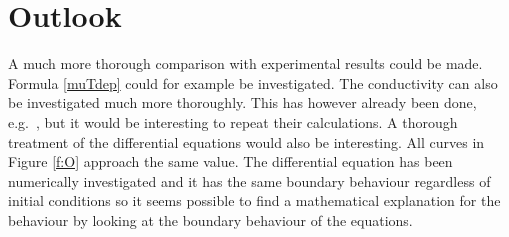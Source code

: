 \documentclass[12pt]{report}
\begin{document}
\section{Outlook}
A much more thorough comparison with experimental results could be made. Formula \eqref{muTdep} could for example be investigated. The conductivity can also be investigated much more thoroughly. This has however already been done, e.g.~\cite{hartnoll8}, but it would be interesting to repeat their calculations. A thorough treatment of the differential equations would also be interesting. All curves in Figure \ref{f:O} approach the same value. The differential equation has been numerically investigated and it has the same boundary behaviour regardless of initial conditions so it seems possible to find a mathematical explanation for the behaviour by looking at the boundary behaviour of the equations.\\
\end{document}
